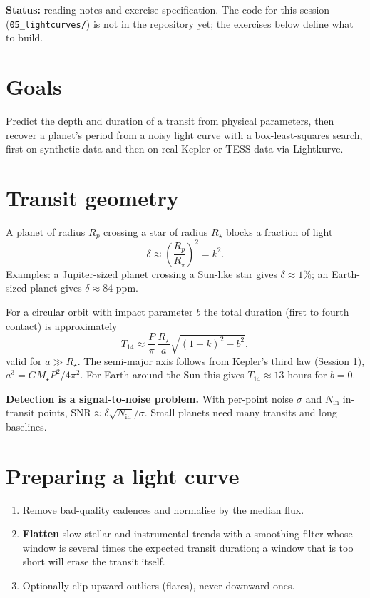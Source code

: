 


\textbf{Status:} reading notes and exercise specification. The code for this session (\texttt{05\_lightcurves/}) is not in the repository yet; the exercises below define what to build.

\section*{Goals}
Predict the depth and duration of a transit from physical parameters, then recover a planet's period from a noisy light curve with a box-least-squares search, first on synthetic data and then on real Kepler or TESS data via Lightkurve.

\section{Transit geometry}
A planet of radius $R_p$ crossing a star of radius $R_\star$ blocks a fraction of light
\[
\delta \approx \left(\frac{R_p}{R_\star}\right)^2 = k^2 .
\]
Examples: a Jupiter-sized planet crossing a Sun-like star gives $\delta\approx1\%$; an Earth-sized planet gives $\delta\approx84$ ppm.

For a circular orbit with impact parameter $b$ the total duration (first to fourth contact) is approximately
\[
T_{14}\approx\frac{P}{\pi}\,\frac{R_\star}{a}\sqrt{(1+k)^2-b^2},
\]
valid for $a\gg R_\star$. The semi-major axis follows from Kepler's third law (Session 1), $a^3=GM_\star P^2/4\pi^2$. For Earth around the Sun this gives $T_{14}\approx 13$ hours for $b=0$.

\begin{keyidea}
\textbf{Detection is a signal-to-noise problem.} With per-point noise $\sigma$ and $N_{\mathrm{in}}$ in-transit points, $\mathrm{SNR}\approx\delta\sqrt{N_{\mathrm{in}}}/\sigma$. Small planets need many transits and long baselines.
\end{keyidea}

\section{Preparing a light curve}
\begin{enumerate}
\item Remove bad-quality cadences and normalise by the median flux.
\item \textbf{Flatten} slow stellar and instrumental trends with a smoothing filter whose window is several times the expected transit duration; a window that is too short will erase the transit itself.
\item Optionally clip upward outliers (flares), never downward ones.
\end{enumerate}

